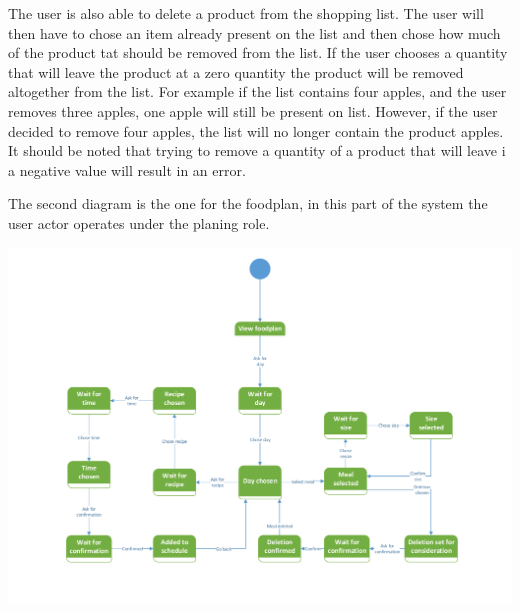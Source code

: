 The user is also able to delete a product from the shopping list. The user will then have to chose an item already present on the list and then chose how much of the product tat should be removed from the list. If the user chooses a quantity that will leave the product at a zero quantity the product will be removed altogether from the list. For example if the list contains four apples, and the user removes three apples, one apple will still be present on list. However, if the user decided to remove four apples, the list will no longer contain the product apples. It should be noted that trying to remove a quantity of a product that will leave i a negative value will result in an error.


The second diagram is the one for the foodplan, in this part of the system the user actor operates under the planing role.

\includegraphics[width=1.0\textwidth]{ApplicationDomain/spViewFoodPlan.pdf} \label{Foodplan_Figure}

\newpage